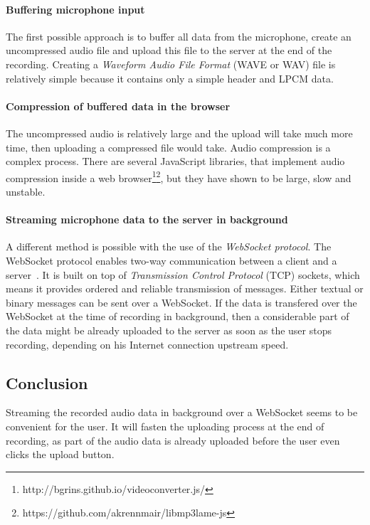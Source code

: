 \paragraph{Buffering microphone input} The first possible approach is to buffer all data from the microphone, create an uncompressed audio file and upload this file to the server at the end of the recording. Creating a \textit{Waveform Audio File Format} (WAVE or WAV) file is relatively simple because it contains only a simple header and LPCM data.

\paragraph{Compression of buffered data in the browser} The uncompressed audio is relatively large and the upload will take much more time, then uploading a compressed file would take. Audio compression is a complex process. There are several JavaScript libraries, that implement audio compression inside a web browser\footnote{http://bgrins.github.io/videoconverter.js/}\footnote{https://github.com/akrennmair/libmp3lame-js}, but they have shown to be large, slow and unstable.

\paragraph{Streaming microphone data to the server in background} A different method is possible with the use of the \textit{WebSocket protocol}. The WebSocket protocol enables two-way communication between a client and a server~\cite{websocket}. It is built on top of \textit{Transmission Control Protocol} (TCP) sockets, which means it provides ordered and reliable transmission of messages. Either textual or binary messages can be sent over a WebSocket. If the data is transfered over the WebSocket at the time of recording in background, then a considerable part of the data might be already uploaded to the server as soon as the user stops recording, depending on his Internet connection upstream speed.

\subsection{Conclusion}
Streaming the recorded audio data in background over a WebSocket seems to be convenient for the user. It will fasten the uploading process at the end of recording, as part of the audio data is already uploaded before the user even clicks the upload button.

